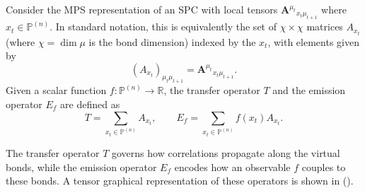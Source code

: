 \begin{definition}
Consider the MPS representation of an SPC with local tensors \(\mathbf{A}^{\mu_t}{}_{x_t\mu_{t+1}}\) where \(x_t \in \mathbb{P}^{(n)}\). In standard notation, this is equivalently the set of \(\chi \times \chi\) matrices \(A_{x_t}\) (where \(\chi = \dim{\mu}\) is the bond dimension) indexed by the \(x_t\), with elements given by
\begin{equation*}
    (A_{x_t})_{\mu_t \mu_{t+1}} = \mathbf{A}^{\mu_t}{}_{x_t \mu_{t+1}}.
\end{equation*}
Given a scalar function \(f : \mathbb{P}^{(n)} \to \mathbb{R}\), the transfer operator \(T\) and the emission operator \(E_f\) are defined as 
\begin{equation}
    T = \sum_{x_t\in\mathbb{P}^{(n)}}A_{x_t},
    \qquad
    E_f = \sum_{x_t\in\mathbb{P}^{(n)}} f(x_t) A_{x_t}.
\end{equation}
\end{definition}
The transfer operator \(T\) governs how correlations propagate along the virtual bonds, while the emission operator \(E_f\) encodes how an observable \(f\) couples to these bonds. A tensor graphical representation of these operators is shown in ().

